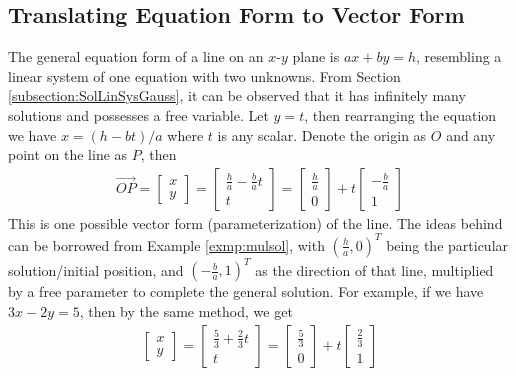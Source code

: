 \subsection{Translating Equation Form to Vector Form}
The general equation form of a line on an $x$-$y$ plane is $ax + by = h$, resembling a linear system of one equation with two unknowns. From Section \ref{subsection:SolLinSysGauss}, it can be observed that it has infinitely many solutions and possesses a free variable. Let $y = t$, then rearranging the equation we have $x = (h - bt)/a$ where $t$ is any scalar. Denote the origin as $O$ and any point on the line as $P$, then 
\begin{align*}
\overrightarrow{OP} =
\begin{bmatrix}
x \\
y
\end{bmatrix}
=
\begin{bmatrix}
\frac{h}{a} - \frac{b}{a}t\\
t
\end{bmatrix}
= 
\begin{bmatrix}
\frac{h}{a}\\
0
\end{bmatrix}
+ t
\begin{bmatrix}
-\frac{b}{a}\\
1
\end{bmatrix}
\end{align*}
This is one possible vector form (parameterization) of the line. The ideas behind can be borrowed from Example \ref{exmp:mulsol}, with $(\frac{h}{a}, 0)^T$ being the particular solution/initial position, and $(-\frac{b}{a}, 1)^T$ as the direction of that line, multiplied by a free parameter to complete the general solution. For example, if we have $3x - 2y = 5$, then by the same method, we get
\begin{align*}
\begin{bmatrix}
x \\
y
\end{bmatrix}
=
\begin{bmatrix}
\frac{5}{3} + \frac{2}{3}t\\
t
\end{bmatrix}
= 
\begin{bmatrix}
\frac{5}{3}\\
0
\end{bmatrix}
+ t
\begin{bmatrix}
\frac{2}{3}\\
1
\end{bmatrix}    
\end{align*}
